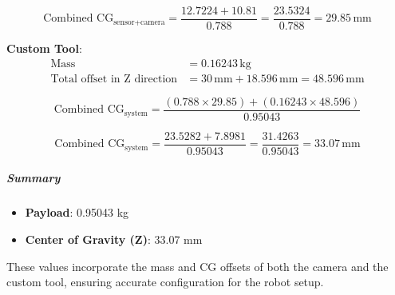 \begin{equation}
\text{Combined CG}_{\text{sensor+camera}} = \frac{12.7224 + 10.81}{0.788} = \frac{23.5324}{0.788} = 29.85 \, \text{mm}
\end{equation}

\textbf{Custom Tool}:
\begin{align*}
\text{Mass} &= 0.16243 \, \text{kg} \\
\text{Total offset in Z direction} &= 30 \, \text{mm} + 18.596 \, \text{mm} = 48.596 \, \text{mm}
\end{align*}

\begin{equation}
\text{Combined CG}_{\text{system}} = \frac{(0.788 \times 29.85) + (0.16243 \times 48.596)}{0.95043}
\end{equation}

\begin{equation}
\text{Combined CG}_{\text{system}} = \frac{23.5282 + 7.8981}{0.95043} = \frac{31.4263}{0.95043} = 33.07 \, \text{mm}
\end{equation}

\subparagraph{Summary}
\begin{itemize}
    \item \textbf{Payload}: 0.95043 kg
    \item \textbf{Center of Gravity (Z)}: 33.07 mm
\end{itemize}

These values incorporate the mass and CG offsets of both the camera and the custom tool, ensuring accurate configuration for the robot setup.